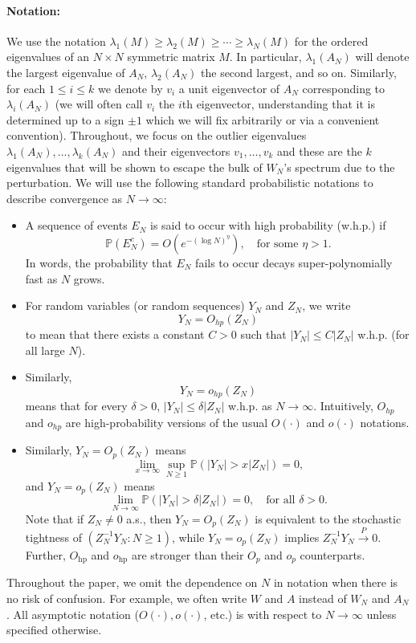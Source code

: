 \documentclass[11pt, reqno]{amsart}
\numberwithin{equation}{section}
\begin{document}
\paragraph{\bf Notation:} We use the notation $\lambda_1(M)\ge \lambda_2(M)\ge \cdots \ge \lambda_N(M)$ for the ordered eigenvalues of an $N\times N$ symmetric matrix $M$. In particular, $\lambda_1(A_N)$ will denote the largest eigenvalue of $A_N$, $\lambda_2(A_N)$ the second largest, and so on. Similarly, for each $1\le i\le k$ we denote by $v_i$ a unit eigenvector of $A_N$ corresponding to $\lambda_i(A_N)$ (we will often call $v_i$ the $i$th eigenvector, understanding that it is determined up to a sign $\pm1$ which we will fix arbitrarily or via a convenient convention). Throughout, we focus on the outlier eigenvalues $\lambda_1(A_N),\ldots,\lambda_k(A_N)$ and their eigenvectors $v_1,\ldots,v_k$ and these are the $k$ eigenvalues that will be shown to escape the bulk of $W_N$’s spectrum due to the perturbation. We will use the following standard probabilistic notations to describe convergence as $N\to\infty$:
\begin{itemize}
 \item   A sequence of events $E_N$ is said to occur with high probability (w.h.p.) if
    \[
        \mathbb{P}(E_N^c) = O\left(e^{-(\log N)^\eta}\right), \quad \text{for some } \eta > 1.
    \]
   In words, the probability that $E_N$ fails to occur decays super-polynomially fast as $N$ grows.

 \item   For random variables (or random sequences) $Y_N$ and $Z_N$, we write
    \[
        Y_N = O_{hp}(Z_N)
    \]
    to mean that there exists a constant $C>0$ such that $|Y_N| \le C |Z_N|$ w.h.p. (for all large $N$).\item Similarly,
   \[
        Y_N = o_{hp}(Z_N)\]
    means that for every $\delta>0$, $|Y_N| \le \delta|Z_N|$ w.h.p. as $N\to\infty$. Intuitively, $O_{hp}$ and $o_{hp}$ are high-probability versions of the usual $O(\cdot)$ and $o(\cdot)$ notations.

\item    Similarly, \( Y_N = O_p(Z_N) \) means
    \[
        \lim_{x \to \infty} \sup_{N \geq 1} \mathbb{P}(|Y_N| > x |Z_N|) = 0,
    \]
    and \( Y_N = o_p(Z_N) \) means
    \[
        \lim_{N \to \infty} \mathbb{P}(|Y_N| > \delta |Z_N|) = 0, \quad \text{for all } \delta > 0.
    \]
Note that if \( Z_N \neq 0 \) a.s., then \( Y_N = O_p(Z_N) \) is equivalent to the stochastic tightness of \((Z_N^{-1}Y_N : N \geq 1)\), while \( Y_N = o_p(Z_N) \) implies \( Z_N^{-1}Y_N \xrightarrow{P} 0 \). Further, \( O_{\mathrm{hp}} \) and \( o_{\mathrm{hp}} \) are stronger than their \( O_p \) and \( o_p \) counterparts.
\end{itemize}
Throughout the paper, we omit the dependence on $N$ in notation when there is no risk of confusion. For example, we often write $W$ and $A$ instead of $W_N$ and $A_N$. All asymptotic notation ($O(\cdot), o(\cdot)$, etc.) is with respect to $N \to \infty$ unless specified otherwise.
\end{document}
